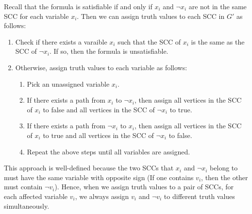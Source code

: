 \documentclass[a4paper,12pt]{article}
\newenvironment{claim}[1]{\par\noindent\underline{Claim:}\space#1}{}
\newenvironment{claimproof}[1]{\par\noindent\underline{Proof:}\space#1}{\hfill $\square$}
\begin{document}
\vspace{0.5cm}

Recall that the formula is satisfiable if and only if $x_i$ and $\neg x_i$ are not in the same SCC for each variable $x_i$.
Then we can assign truth values to each SCC in $G'$ as follows:
\begin{enumerate}
	\item Check if there exists a varaible $x_i$ such that the SCC of $x_i$ is the same as the SCC of $\neg x_i$.
		If so, then the formula is unsatisfiable.
	\item Otherwise, assign truth values to each variable as follows:
		\begin{enumerate}
			\item Pick an unassigned variable $x_i$.
			\item If there exists a path from $x_i$ to $\neg x_i$, then assign all vertices in the SCC of $x_i$ to false and all vertices in the SCC of $\neg x_i$ to true.
			\item If there exists a path from $\neg x_i$ to $x_i$, then assign all vertices in the SCC of $x_i$ to true and all vertices in the SCC of $\neg x_i$ to false.
			\item Repeat the above steps until all variables are assigned.
		\end{enumerate}
\end{enumerate}

This approach is well-defined because the two SCCs that $x_i$ and $\neg x_i$ belong to must have the same variable with opposite sign (If one contains $v_i$, then the other must contain $\neg v_i$).
Hence, when we assign truth values to a pair of SCCs, for each affected variable $v_i$, we always assign $v_i$ and $\neg v_i$ to different truth values simultaneously.


\end{document}
